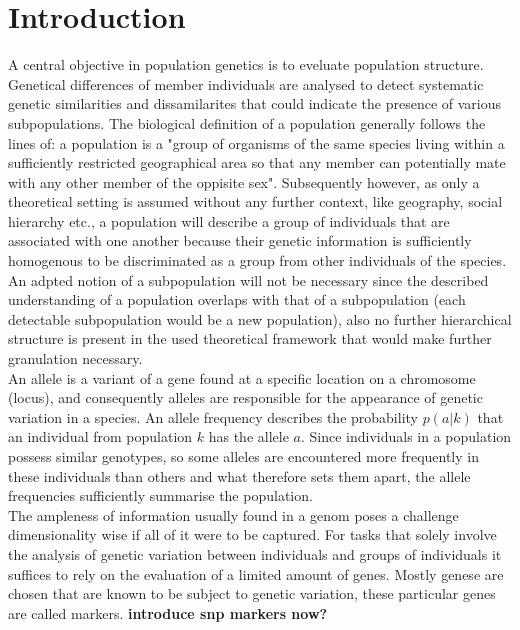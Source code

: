 \documentclass[a4paper, 11pt]{article}
\begin{document}
\section{Introduction}
A central objective in population genetics is to eveluate population structure. Genetical differences of member individuals are analysed  to detect systematic genetic similarities and dissamilarites that could indicate the presence of various subpopulations. The biological definition of a population generally follows the lines of: a population is a "group of organisms of the same species living within a sufficiently restricted geographical area so that any member can potentially mate with any other member of the oppisite sex". Subsequently however, as only a theoretical setting is assumed without any further context, like geography, social hierarchy etc., a population will describe a group of individuals that are associated with one another because their genetic information is  sufficiently homogenous to be discriminated as a group from other individuals of the species. An adpted notion of a subpopulation will not be necessary since the described understanding of a population overlaps with that of a subpopulation (each detectable subpopulation would be a new population), also no further hierarchical structure is present in the used theoretical framework that would make further granulation necessary.\\
An allele is a variant of a gene found at a specific location on a chromosome (locus), and consequently alleles are responsible for the appearance of genetic variation in a species. An allele frequency describes the probability $p(a | k)$ that an individual from population $k$ has the allele $a$. Since individuals in a population possess similar genotypes, so some alleles are encountered more frequently in these individuals than others and what therefore sets them apart, the allele frequencies sufficiently summarise the population.\\
The ampleness of information usually found in a genom poses a challenge dimensionality wise if all of it were to be captured. For tasks that solely involve the analysis of genetic variation between individuals and groups of individuals it suffices to rely on the evaluation of a limited amount of genes. Mostly genese are chosen that are known to be subject to genetic variation, these particular genes are called markers. \textbf{introduce snp markers now?} \\
\end{document}

